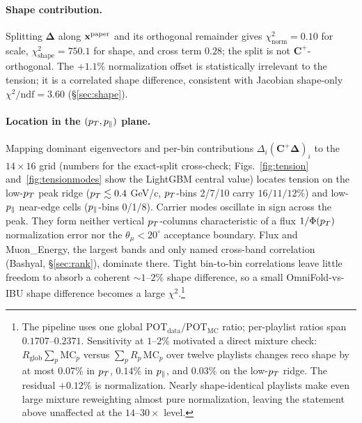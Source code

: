 \paragraph{Shape contribution.} Splitting $\boldsymbol{\Delta}$ along $\mathbf{x}^{\text{paper}}$ and its orthogonal remainder gives $\chi^{2}_{\mathrm{norm}}=0.10$ for scale, $\chi^{2}_{\text{shape}}=750.1$ for shape, and cross term $0.28$; the split is not $\mathbf{C}^{+}$-orthogonal. The $+1.1\%$ normalization offset is statistically irrelevant to the tension; it is a correlated shape difference, consistent with Jacobian shape-only $\chi^{2}/\mathrm{ndf}=3.60$ (\S\ref{sec:shape}).

\paragraph{Location in the $(p_{T},p_{\parallel})$ plane.} Mapping dominant eigenvectors and per-bin contributions $\Delta_{i}(\mathbf{C}^{+}\boldsymbol{\Delta})_{i}$ to the $14\times16$ grid (numbers for the exact-split cross-check; Figs.~\ref{fig:tension} and~\ref{fig:tensionmodes} show the LightGBM central value) locates tension on the low-$p_{T}$ peak ridge ($p_{T}\lesssim0.4$ GeV/c, $p_{T}$-bins 2/7/10 carry $16/11/12\%$) and low-$p_{\parallel}$ near-edge cells ($p_{\parallel}$-bins 0/1/8). Carrier modes oscillate in sign across the peak. They form neither vertical $p_{T}$-columns characteristic of a flux $1/\Phi(p_{T})$ normalization error nor the $\theta_{\mu}<20^{\circ}$ acceptance boundary. Flux and Muon\_Energy, the largest bands and only named cross-band correlation (Bashyal, \S\ref{sec:rank}), dominate there. Tight bin-to-bin correlations leave little freedom to absorb a coherent $\sim1$--$2\%$ shape difference, so a small OmniFold-vs-IBU shape difference becomes a large $\chi^{2}$.\footnote{The pipeline uses one global $\mathrm{POT}_{\mathrm{data}}/\mathrm{POT}_{\mathrm{MC}}$ ratio; per-playlist ratios span $0.1707$--$0.2371$. Sensitivity at $1$--$2\%$ motivated a direct mixture check: $R_{\mathrm{glob}}\sum_p \mathrm{MC}_p$ versus $\sum_p R_p\,\mathrm{MC}_p$ over twelve playlists changes reco shape by at most $0.07\%$ in $p_{T}$, $0.14\%$ in $p_{\parallel}$, and $0.03\%$ on the low-$p_{T}$ ridge. The residual $+0.12\%$ is normalization. Nearly shape-identical playlists make even large mixture reweighting almost pure normalization, leaving the statement above unaffected at the $14$--$30\times$ level.}
%

